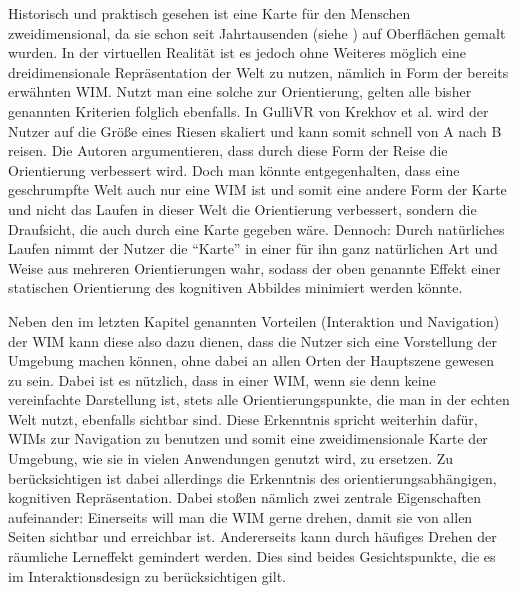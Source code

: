 Historisch und praktisch gesehen ist eine Karte für den Menschen zweidimensional, da sie schon seit Jahrtausenden (siehe \cite{meece_2006}) auf Oberflächen gemalt wurden. 
In der virtuellen Realität ist es jedoch ohne Weiteres möglich eine dreidimensionale Repräsentation der Welt zu nutzen, nämlich in Form der bereits erwähnten WIM.
Nutzt man eine solche zur Orientierung, gelten alle bisher genannten Kriterien folglich ebenfalls.
In GulliVR von Krekhov et al. \cite{Krekhov2018GulliVR} wird der Nutzer auf die Größe eines Riesen skaliert und kann somit schnell von A nach B reisen. Die Autoren argumentieren, dass durch diese Form der Reise die Orientierung verbessert wird. Doch man könnte entgegenhalten, dass eine geschrumpfte Welt auch nur eine WIM ist und somit eine andere Form der Karte und nicht das Laufen in dieser Welt die Orientierung verbessert, sondern die Draufsicht, die auch durch eine Karte gegeben wäre.
Dennoch: Durch natürliches Laufen nimmt der Nutzer die “Karte” in einer für ihn ganz natürlichen Art und Weise aus mehreren Orientierungen wahr, sodass der oben genannte Effekt einer statischen Orientierung des kognitiven Abbildes minimiert werden könnte.

Neben den im letzten Kapitel genannten Vorteilen (Interaktion und Navigation) der WIM kann diese also dazu dienen, dass die Nutzer sich eine Vorstellung der Umgebung machen können, ohne dabei an allen Orten der Hauptszene gewesen zu sein. Dabei ist es nützlich, dass in einer WIM, wenn sie denn keine vereinfachte Darstellung ist, stets alle Orientierungspunkte, die man in der echten Welt nutzt, ebenfalls sichtbar sind.
Diese Erkenntnis spricht weiterhin dafür, WIMs zur Navigation zu benutzen und somit eine zweidimensionale Karte der Umgebung, wie sie in vielen Anwendungen genutzt wird, zu ersetzen.
Zu berücksichtigen ist dabei allerdings die Erkenntnis des orientierungsabhängigen, kognitiven Repräsentation. Dabei stoßen nämlich zwei zentrale Eigenschaften aufeinander: Einerseits will man die WIM gerne drehen, damit sie von allen Seiten sichtbar und erreichbar ist. Andererseits kann durch häufiges Drehen der räumliche Lerneffekt gemindert werden. Dies sind beides Gesichtspunkte, die es im Interaktionsdesign zu berücksichtigen gilt.